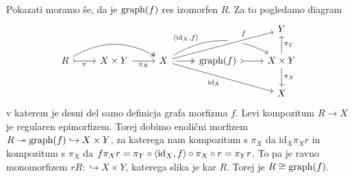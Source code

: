 \documentclass[../kategoricna_logika.tex]{subfiles}
\begin{document}
\begin{dokaz}
\begin{enumerate}[label=(\roman*)]
    Pokazati moramo še, da je $\operatorname{graph}(f)$ res izomorfen $R$. Za to pogledamo diagram
    \begin{equation*}
    \begin{tikzcd}
      & & & & Y \\
      R \ar[r, tail, "r"'] \ar[rr, two heads, bend left] & X \times Y \ar[r, "\pi_X"'] & X \ar[r, two heads]  \ar[rr, bend left, pos=0.3, "\fprod{\mathrm{id}_X, f}"] \ar[urr, crossing over, pos=0.75, "f"] \ar[drr, "\mathrm{id}_X"']  & \operatorname{graph}(f) \ar[r, tail] & X \times Y \ar[d, "\pi_X"] \ar[u, "\pi_Y"'] \\
      & & & & X
    \end{tikzcd}
    \end{equation*}
    v katerem je desni del samo definicja grafa morfizma $f$.
    Levi kompozitum $R \to X$ je regularen epimorfizem.
    Torej dobimo enolični morfizem $R \twoheadrightarrow \operatorname{graph}(f) \hookrightarrow X \times Y$,
    za katerega nam kompozitum s $\pi_X$ da $\mathrm{id}_X \pi_X r$ in kompozitum s $\pi_X$ da 
    $f \pi_X r = \pi_Y \circ \langle \mathrm{id}_X, f \rangle \circ \pi_X \circ r = \pi_Y r$.
    To pa je ravno monomorfizem $r R : \hookrightarrow X \times Y$, katerega slika je kar $R$.
    Torej je $R \cong \operatorname{graph}(f)$.
\end{enumerate}
\end{dokaz}
\end{document}
